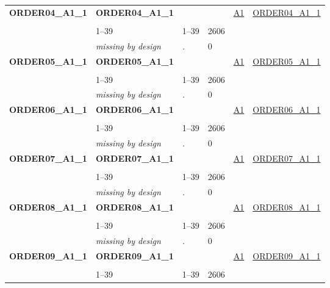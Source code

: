 \begin{longtable}{| L{2.45cm} | L{6cm} | C{1.5cm} | R{1cm} | C{2.25cm} | C{2.25cm} |}
   \midrule
\textbf{ORDER04\_A1\_1}\label{var:ORDER04:A1:1} & \textbf{ORDER04\_A1\_1} &  &  & \hyperref[A1]{A1} & \hyperref[var:suf:ORDER04:A1:1]{ORDER04\_A1\_1} \\ 
   &  &  &  &  &  \\ 
   & 1--39 & 1--39 & 2606 &  &  \\ 
   & \textit{missing by design} & \textit{.} & 0 &  &  \\ 
   \midrule
\textbf{ORDER05\_A1\_1}\label{var:ORDER05:A1:1} & \textbf{ORDER05\_A1\_1} &  &  & \hyperref[A1]{A1} & \hyperref[var:suf:ORDER05:A1:1]{ORDER05\_A1\_1} \\ 
   &  &  &  &  &  \\ 
   & 1--39 & 1--39 & 2606 &  &  \\ 
   & \textit{missing by design} & \textit{.} & 0 &  &  \\ 
   \midrule
\textbf{ORDER06\_A1\_1}\label{var:ORDER06:A1:1} & \textbf{ORDER06\_A1\_1} &  &  & \hyperref[A1]{A1} & \hyperref[var:suf:ORDER06:A1:1]{ORDER06\_A1\_1} \\ 
   &  &  &  &  &  \\ 
   & 1--39 & 1--39 & 2606 &  &  \\ 
   & \textit{missing by design} & \textit{.} & 0 &  &  \\ 
   \midrule
\textbf{ORDER07\_A1\_1}\label{var:ORDER07:A1:1} & \textbf{ORDER07\_A1\_1} &  &  & \hyperref[A1]{A1} & \hyperref[var:suf:ORDER07:A1:1]{ORDER07\_A1\_1} \\ 
   &  &  &  &  &  \\ 
   & 1--39 & 1--39 & 2606 &  &  \\ 
   & \textit{missing by design} & \textit{.} & 0 &  &  \\ 
   \midrule
\textbf{ORDER08\_A1\_1}\label{var:ORDER08:A1:1} & \textbf{ORDER08\_A1\_1} &  &  & \hyperref[A1]{A1} & \hyperref[var:suf:ORDER08:A1:1]{ORDER08\_A1\_1} \\ 
   &  &  &  &  &  \\ 
   & 1--39 & 1--39 & 2606 &  &  \\ 
   & \textit{missing by design} & \textit{.} & 0 &  &  \\ 
   \midrule
\textbf{ORDER09\_A1\_1}\label{var:ORDER09:A1:1} & \textbf{ORDER09\_A1\_1} &  &  & \hyperref[A1]{A1} & \hyperref[var:suf:ORDER09:A1:1]{ORDER09\_A1\_1} \\ 
   &  &  &  &  &  \\ 
   & 1--39 & 1--39 & 2606 &  &  \\ 

\end{longtable}
